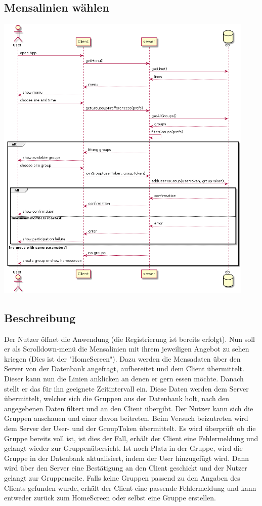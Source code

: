 \documentclass[a4paper]{scrreprt}
\begin{document}
\subsection{Mensalinien wählen}
\begin{center}
	\includegraphics[width=0.93\textwidth]{Sequenzdiagramme/chooseLineAndTimeSD.png}
\end{center}
\subsection*{Beschreibung}
Der Nutzer öffnet die Anwendung (die Registrierung ist bereits erfolgt). Nun soll er als Scrolldown-menü die Mensalinien mit ihrem jeweiligen Angebot zu sehen kriegen (Dies ist der "HomeScreen"). Dazu werden die Mensadaten über den Server von der Datenbank angefragt, aufbereitet und dem Client übermittelt. Dieser kann nun die Linien anklicken an denen er gern essen möchte. Danach stellt er das für ihn geeignete Zeitintervall ein. Diese Daten werden dem Server übermittelt, welcher sich die Gruppen aus der Datenbank holt, nach den angegebenen Daten filtert und an den Client übergibt. Der Nutzer kann sich die Gruppen anschauen und einer davon beitreten. Beim Versuch beizutreten wird dem Server der User- und der GroupToken übermittelt. Es wird überprüft ob die Gruppe bereits voll ist, ist dies der Fall, erhält der Client eine Fehlermeldung und gelangt wieder zur Gruppenübersicht. Ist noch Platz in der Gruppe, wird die Gruppe in der Datenbank aktualisiert, indem der User hinzugefügt wird. Dann wird über den Server eine Bestätigung an den Client geschickt und der Nutzer gelangt zur Gruppenseite. 
Falls keine Gruppen passend zu den Angaben des Clients gefunden wurde, erhält der Client eine passende Fehlermeldung und kann entweder zurück zum HomeScreen oder selbst eine Gruppe erstellen.
\end{document}

